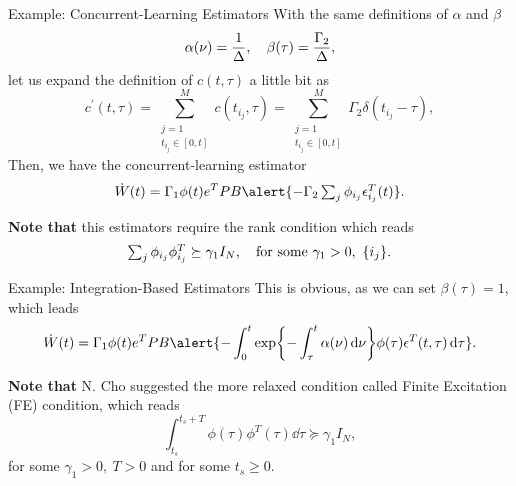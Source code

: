 \documentclass[handout]{beamer}
\theoremstyle{plain}
\theoremstyle{definition}
\theoremstyle{remark}
\begin{document}
\begin{frame}{Example: Concurrent-Learning Estimators}
	With the same definitions of $\alpha$ and $\beta$
	\begin{equation*}
		\alpha(\nu) = \frac{1}{\Delta} \qc \beta(\tau) = \frac{\Gamma_2}{\Delta},
	\end{equation*}
	let us expand the definition of $c(t, \tau)$ a little bit as
	\begin{equation*}
		c^\prime(t, \tau) = \sum_{\substack{j=1 \\ t_{i_j} \in [0, t]}}^{M}
		c(t_{i_j}, \tau) = \sum_{\substack{j=1 \\ t_{i_j} \in [0, t]}}^{M}
		\Gamma_2 \delta(t_{i_j} - \tau),
	\end{equation*}
	Then, we have the concurrent-learning estimator
	\begin{equation*}
		\dot{W}(t) = \Gamma_1 \phi(t) e^T P B \alert{- \Gamma_2
		\textstyle\sum_j \phi_{i_j} \epsilon_{i_j}^T(t)}.
	\end{equation*}
	\pause

	\textbf{Note that} this estimators require the \alert{rank condition} which
	reads
	\begin{equation*}
		\textstyle\sum_j \phi_{i_j} \phi^T_{i_j} \succeq \gamma_1 I_N \qc \text{for
		some } \gamma_1 > 0,\ \{i_j\}.
	\end{equation*}
\end{frame}

\begin{frame}{Example: Integration-Based Estimators}
	This is obvious, as we can set $\beta(\tau) = 1$, which leads
	\begin{equation*}
		\dot{W}(t) = \Gamma_1 \phi(t) e^T P B \alert{- \int_0^t
			\exp{- \int_\tau^t \alpha(\nu) \dd{\nu}} \phi(\tau) \epsilon^T(t,
		\tau) \dd{\tau}}.
	\end{equation*}

	\textbf{Note that} N. Cho suggested the more relaxed condition called
	\alert{Finite Excitation (FE)} condition, which reads
	\begin{equation*}
		\int_{t_s}^{t_s + T} \phi(\tau) \phi^T(\tau) \dd{\tau} \succeq \gamma_1
		I_N,
	\end{equation*}
	for some $\gamma_1 > 0,\ T > 0$ and for \alert{some} $t_s \ge 0$.
\end{frame}
\end{document}
